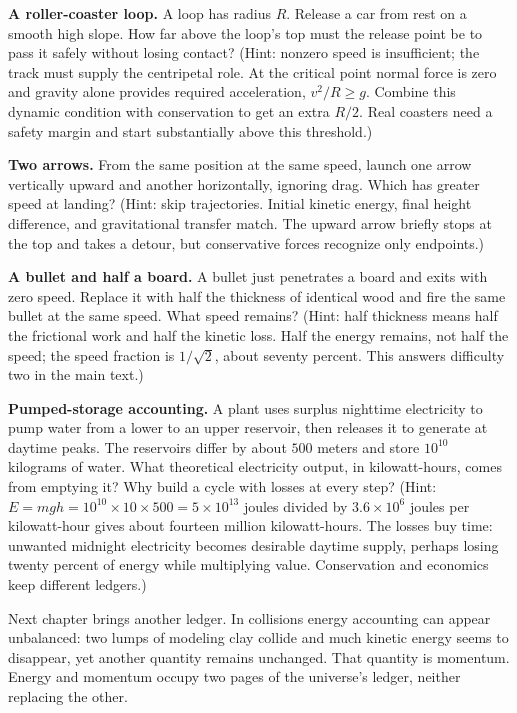 \begin{puzzles}
\item \textbf{A roller-coaster loop.} A loop has radius \(R\). Release a car from rest on a smooth high slope. How far above the loop's top must the release point be to pass it safely without losing contact? (Hint: nonzero speed is insufficient; the track must supply the centripetal role. At the critical point normal force is zero and gravity alone provides required acceleration, \(v^{2}/R\geq g\). Combine this dynamic condition with conservation to get an extra \(R/2\). Real coasters need a safety margin and start substantially above this threshold.)
\item \textbf{Two arrows.} From the same position at the same speed, launch one arrow vertically upward and another horizontally, ignoring drag. Which has greater speed at landing? (Hint: skip trajectories. Initial kinetic energy, final height difference, and gravitational transfer match. The upward arrow briefly stops at the top and takes a detour, but conservative forces recognize only endpoints.)
\item \textbf{A bullet and half a board.} A bullet just penetrates a board and exits with zero speed. Replace it with half the thickness of identical wood and fire the same bullet at the same speed. What speed remains? (Hint: half thickness means half the frictional work and half the kinetic loss. Half the energy remains, not half the speed; the speed fraction is \(1/\sqrt{2}\), about seventy percent. This answers difficulty two in the main text.)
\item \textbf{Pumped-storage accounting.} A plant uses surplus nighttime electricity to pump water from a lower to an upper reservoir, then releases it to generate at daytime peaks. The reservoirs differ by about \(500\) meters and store \(10^{10}\) kilograms of water. What theoretical electricity output, in kilowatt-hours, comes from emptying it? Why build a cycle with losses at every step? (Hint: \(E=mgh=10^{10}\times10\times500=5\times10^{13}\) joules divided by \(3.6\times10^{6}\) joules per kilowatt-hour gives about fourteen million kilowatt-hours. The losses buy time: unwanted midnight electricity becomes desirable daytime supply, perhaps losing twenty percent of energy while multiplying value. Conservation and economics keep different ledgers.)
\end{puzzles}

Next chapter brings another ledger. In collisions energy accounting can appear unbalanced: two lumps of modeling clay collide and much kinetic energy seems to disappear, yet another quantity remains unchanged. That quantity is momentum. Energy and momentum occupy two pages of the universe's ledger, neither replacing the other.
